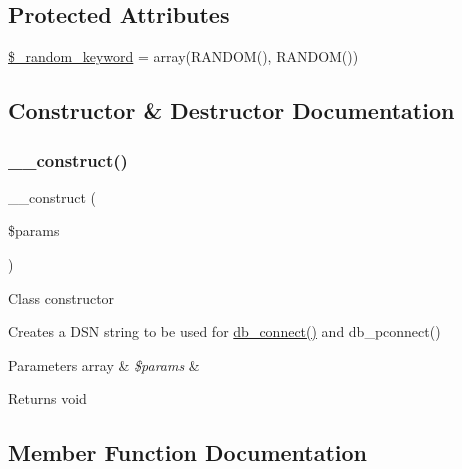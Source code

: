 \subsection*{Protected Attributes}
\begin{DoxyCompactItemize}
\item 
\mbox{\hyperlink{class_c_i___d_b__postgre__driver_a10213aa6e05f6d924d3277bb1d2fea00}{\$\+\_\+random\+\_\+keyword}} = array(\textquotesingle{}R\+A\+N\+D\+OM()\textquotesingle{}, \textquotesingle{}R\+A\+N\+D\+OM()\textquotesingle{})
\end{DoxyCompactItemize}


\subsection{Constructor \& Destructor Documentation}
\mbox{\label{class_c_i___d_b__postgre__driver_a9162320adff1a1a4afd7f2372f753a3e}} 
\subsubsection{\texorpdfstring{\+\_\+\+\_\+construct()}{\_\_construct()}}
{\footnotesize\ttfamily \+\_\+\+\_\+construct (\begin{DoxyParamCaption}\item[{}]{\$params }\end{DoxyParamCaption})}

Class constructor

Creates a D\+SN string to be used for \mbox{\hyperlink{class_c_i___d_b__postgre__driver_a52bf595e79e96cc0a7c907a9b45aeb4d}{db\+\_\+connect()}} and db\+\_\+pconnect()


\begin{DoxyParams}[1]{Parameters}
array & {\em \$params} & \\
\hline
\end{DoxyParams}
\begin{DoxyReturn}{Returns}
void 
\end{DoxyReturn}


\subsection{Member Function Documentation}
\mbox{\label{class_c_i___d_b__postgre__driver_a4d9082658000e5ede8312067c6dda9db}} 
